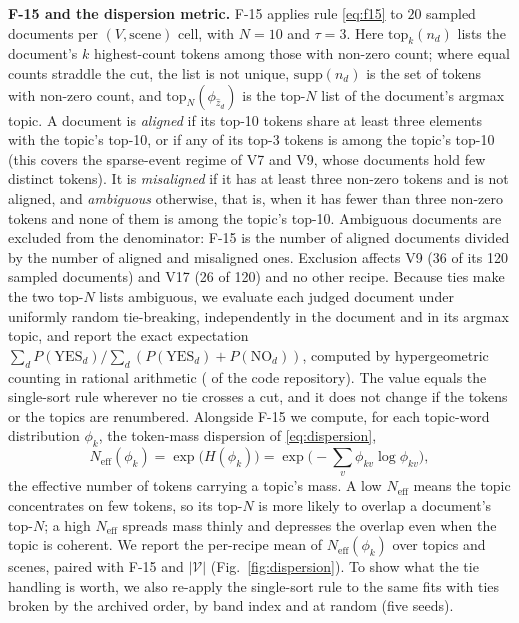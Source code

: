 \documentclass[journal,a4paper,10pt]{IEEEtran}
\begin{document}
\textbf{F-15 and the dispersion metric.} F-15 applies rule
\eqref{eq:f15} to $20$ sampled documents per $(V,\text{scene})$ cell,
with $N=10$ and $\tau=3$. Here $\mathrm{top}_k(n_d)$ lists the
document's $k$ highest-count tokens among those with non-zero count;
where equal counts straddle the cut, the list is not unique,
$\mathrm{supp}(n_d)$ is the set of tokens with non-zero count, and
$\mathrm{top}_N(\phi_{\hat z_d})$ is the top-$N$ list of the document's
argmax topic. A document is \emph{aligned} if its top-10 tokens share
at least three elements with the topic's top-10, or if any of its
top-3 tokens is among the topic's top-10 (this covers the sparse-event
regime of V7 and V9, whose documents hold few distinct tokens). It is
\emph{misaligned} if it has at least three non-zero tokens and is not
aligned, and \emph{ambiguous} otherwise, that is, when it has fewer
than three non-zero tokens and none of them is among the topic's
top-10. Ambiguous documents are excluded from the denominator: F-15 is
the number of aligned documents divided by the number of aligned and
misaligned ones. Exclusion affects V9 (36 of its 120 sampled documents)
and V17 (26 of 120) and no other recipe. Because ties make the two
top-$N$ lists ambiguous, we evaluate each judged document under
uniformly random tie-breaking, independently in the document and in its
argmax topic, and report the exact expectation
$\sum_d P(\mathrm{YES}_d) / \sum_d (P(\mathrm{YES}_d) +
P(\mathrm{NO}_d))$, computed by hypergeometric counting in rational
arithmetic ( of the code
repository). The value equals the single-sort rule wherever no tie
crosses a cut, and it does not change if the tokens or the topics are
renumbered. Alongside F-15 we compute,
for each topic-word distribution $\phi_k$, the token-mass dispersion
of \eqref{eq:dispersion},
\[
  N_{\mathrm{eff}}(\phi_k) = \exp\!\big(H(\phi_k)\big)
  = \exp\!\Big(-\textstyle\sum_v \phi_{kv}\log\phi_{kv}\Big),
\]
the effective number of tokens carrying a topic's mass. A low
$N_{\mathrm{eff}}$ means the topic concentrates on few tokens, so its
top-$N$ is more likely to overlap a document's top-$N$; a high
$N_{\mathrm{eff}}$ spreads mass thinly and depresses the overlap even
when the topic is coherent. We report the per-recipe mean of
$N_{\mathrm{eff}}(\phi_k)$ over topics and scenes, paired with F-15 and
$|\mathcal{V}|$ (Fig.~\ref{fig:dispersion}). To show what the tie
handling is worth, we also re-apply the single-sort rule to the same
fits with ties broken by the archived order, by band index and at
random (five seeds).
\end{document}
